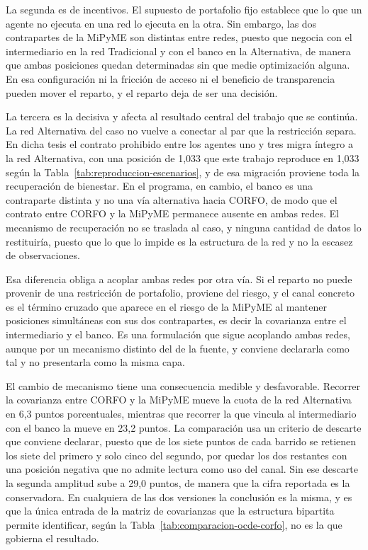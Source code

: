 La segunda es de incentivos. El supuesto de portafolio fijo establece que lo que un agente no ejecuta en una red lo ejecuta en la otra. Sin embargo, las dos contrapartes de la MiPyME son distintas entre redes, puesto que negocia con el intermediario en la red Tradicional y con el banco en la Alternativa, de manera que ambas posiciones quedan determinadas sin que medie optimización alguna. En esa configuración ni la fricción de acceso ni el beneficio de transparencia pueden mover el reparto, y el reparto deja de ser una decisión.

La tercera es la decisiva y afecta al resultado central del trabajo que se continúa. La red Alternativa del caso no vuelve a conectar al par que la restricción separa. En dicha tesis el contrato prohibido entre los agentes uno y tres migra íntegro a la red Alternativa, con una posición de 1,033 que este trabajo reproduce en 1,033 según la Tabla~\ref{tab:reproduccion-escenarios}, y de esa migración proviene toda la recuperación de bienestar. En el programa, en cambio, el banco es una contraparte distinta y no una vía alternativa hacia CORFO, de modo que el contrato entre CORFO y la MiPyME permanece ausente en ambas redes. El mecanismo de recuperación no se traslada al caso, y ninguna cantidad de datos lo restituiría, puesto que lo que lo impide es la estructura de la red y no la escasez de observaciones.

Esa diferencia obliga a acoplar ambas redes por otra vía. Si el reparto no puede provenir de una restricción de portafolio, proviene del riesgo, y el canal concreto es el término cruzado que aparece en el riesgo de la MiPyME al mantener posiciones simultáneas con sus dos contrapartes, es decir la covarianza entre el intermediario y el banco. Es una formulación que sigue acoplando ambas redes, aunque por un mecanismo distinto del de la fuente, y conviene declararla como tal y no presentarla como la misma capa.

El cambio de mecanismo tiene una consecuencia medible y desfavorable. Recorrer la covarianza entre CORFO y la MiPyME mueve la cuota de la red Alternativa en 6,3 puntos porcentuales, mientras que recorrer la que vincula al intermediario con el banco la mueve en 23,2 puntos. La comparación usa un criterio de descarte que conviene declarar, puesto que de los siete puntos de cada barrido se retienen los siete del primero y solo cinco del segundo, por quedar los dos restantes con una posición negativa que no admite lectura como uso del canal. Sin ese descarte la segunda amplitud sube a 29,0 puntos, de manera que la cifra reportada es la conservadora. En cualquiera de las dos versiones la conclusión es la misma, y es que la única entrada de la matriz de covarianzas que la estructura bipartita permite identificar, según la Tabla~\ref{tab:comparacion-ocde-corfo}, no es la que gobierna el resultado.

